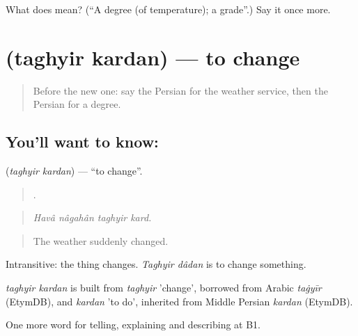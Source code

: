 \begin{tcolorbox}[breakable,colback=teal!4,colframe=teal!35!black,title={Before you move on}]
What does  mean? (\textquotedblleft{}A degree (of temperature); a grade\textquotedblright{}.) Say it once more.
\end{tcolorbox}
\section[\texorpdfstring{\fa{تغییر} \fa{کردن} (taghyir kardan)}{تغییر کردن (taghyir kardan)}]{  (taghyir kardan) — to change}

\label{lesson:FA-C473-taghyir-kardan}



\begin{quote}
Before the new one: say the Persian for the weather service, then the Persian for a degree.
\end{quote}

\subsection*{You'll want to know:  }
\textbf{ } (\emph{taghyir kardan}) — \textquotedblleft{}to change\textquotedblright{}.

\begin{quote}
   .
\end{quote}

\begin{quote}
\emph{Havâ nâgahân taghyir kard.}
\end{quote}

\begin{quote}
The weather suddenly changed.
\end{quote}

Intransitive: the thing changes. \emph{Taghyir dâdan} is to change something.

\begin{cousinweb}
\emph{taghyir kardan} is built from \emph{taghyir} 'change', borrowed from Arabic \emph{taġyīr} (EtymDB), and \emph{kardan} 'to do', inherited from Middle Persian \emph{kardan} (EtymDB).
\end{cousinweb}

\begin{grammarlens}[title={What you've built}]
One more word for telling, explaining and describing at B1.
\end{grammarlens}

